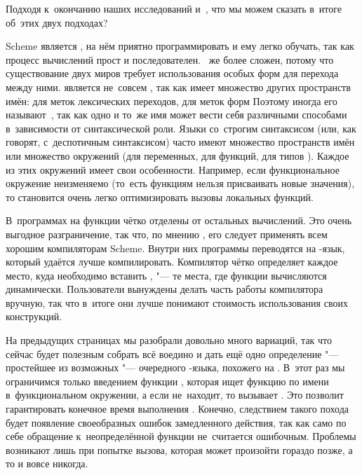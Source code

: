 Подходя к~окончанию наших исследований  и~, что мы можем сказать
в~итоге об~этих двух подходах?

Scheme является , на нём приятно программировать и ему легко обучать, так
как процесс вычислений прост и последователен. ~же более сложен, потому
что существование двух миров требует использования особых форм для перехода
между ними. {\CommonLisp} является не~совсем , так как имеет множество
других пространств имён: для меток лексических переходов, для меток форм
 {\itd} Поэтому иногда его называют~, так как одно и
то~же имя может вести себя различными способами в~зависимости от синтаксической
роли. Языки со~строгим синтаксисом (или, как говорят, с~деспотичным синтаксисом)
часто имеют множество пространств имён или множество окружений (для переменных,
для функций, для типов {\itd}). Каждое из этих окружений имеет свои
особенности. Например, если функциональное окружение неизменяемо (то~есть
функциям нельзя присваивать новые значения), то становится очень легко
оптимизировать вызовы локальных функций.

В~программах на  функции чётко отделены от остальных вычислений. Это очень
выгодное разграничение, так что, по мнению \cite{sen89}, его следует применять
всем хорошим компиляторам Scheme. Внутри них программы переводятся на
-язык, который удаётся лучше компилировать. Компилятор чётко определяет
каждое место, куда необходимо вставить , "--- те места, где функции
вычисляются динамически. Пользователи  вынуждены делать часть работы
компилятора вручную, так что в~итоге они лучше понимают стоимость использования
своих конструкций.

На предыдущих страницах мы разобрали довольно много вариаций, так что сейчас
будет полезным собрать всё воедино и дать ещё одно определение "--- простейшее
из возможных "--- очередного -языка, похожего на {\CommonLisp}. В~этот раз
мы ограничимся только введением функции , которая ищет функцию по
имени в~функциональном окружении, а если не~находит, то вызывает . Это
позволит гарантировать конечное время выполнения . Конечно,
следствием такого похода будет появление своеобразных ошибок замедленного
действия, так как само по себе обращение к~неопределённой функции не~считается
ошибочным. Проблемы возникают лишь при попытке вызова, которая может произойти
гораздо позже, а то и вовсе никогда.

